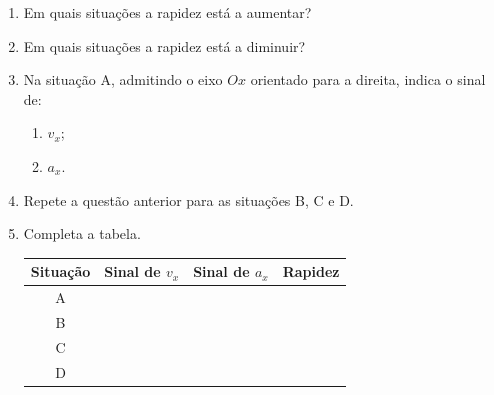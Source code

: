 \documentclass[11pt,a4paper]{article}
\newcommand{\resposta}[1][0.8]{
	\vspace{#1cm}
}
\begin{document}
	\begin{enumerate}[label=\textbf{\arabic*.},resume]
		
		\item Em quais situações a rapidez está a aumentar?
		
		\resposta[0.7]
		
		\item Em quais situações a rapidez está a diminuir?
		
		\resposta[0.7]
		
		\item Na situação A, admitindo o eixo $Ox$ orientado para a direita, indica o
		sinal de:
		
		\begin{enumerate}[label=\alph*)]
			\item $v_x$;
			\item $a_x$.
		\end{enumerate}
		
		\resposta[0.7]
		
		\item Repete a questão anterior para as situações B, C e D.
		
		\resposta[1.2]
		
		\item Completa a tabela.
		
		\begin{center}
			
			\renewcommand{\arraystretch}{1.45}
			
			\begin{tabular}{c|c|c|c}
				
				\toprule
				
				\textbf{Situação} &
				\textbf{Sinal de $v_x$} &
				\textbf{Sinal de $a_x$} &
				\textbf{Rapidez}
				
				\\
				
				\midrule
				
				A & & & \\[0.35cm]
				
				B & & & \\[0.35cm]
				
				C & & & \\[0.35cm]
				
				D & & & \\[0.35cm]
				
				\bottomrule
				
			\end{tabular}
			
		\end{center}
		
	\end{enumerate}
	
\end{document}
